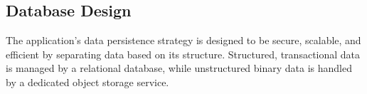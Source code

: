 \subsection{Database Design}
\label{database-design}

The application's data persistence strategy is designed to be secure, scalable, and efficient by separating data based on its structure. Structured, transactional data is managed by a relational database, while unstructured binary data is handled by a dedicated object storage service.







